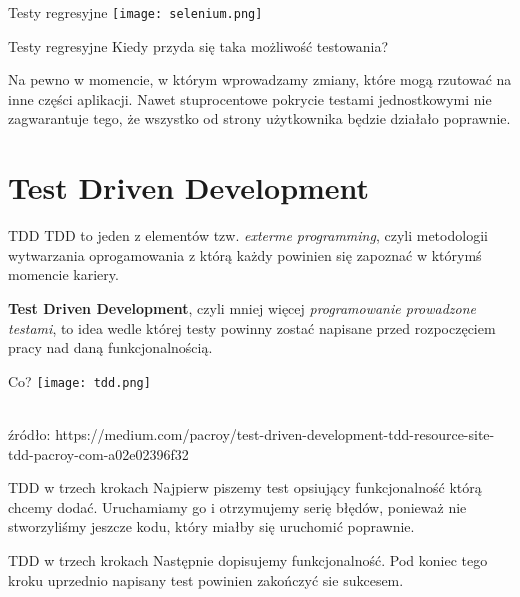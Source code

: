 \begin{frame}{Testy regresyjne}
	\centering
	\texttt{[image: selenium.png]}
\end{frame}

\begin{frame}{Testy regresyjne}
	Kiedy przyda się taka możliwość testowania?
	
	Na pewno w momencie, w którym wprowadzamy zmiany, które mogą rzutować na inne części aplikacji. Nawet stuprocentowe pokrycie testami jednostkowymi nie zagwarantuje tego, że wszystko od strony użytkownika będzie działało poprawnie.
\end{frame}

\section{Test Driven Development}

\begin{frame}[fragile]{TDD}
	TDD to jeden z elementów tzw. \emph{exterme programming}, czyli metodologii wytwarzania oprogamowania z którą każdy powinien się zapoznać w którymś momencie kariery.
	
	\textbf{Test Driven Development}, czyli mniej więcej \emph{programowanie prowadzone testami}, to idea wedle której testy powinny zostać napisane przed rozpoczęciem pracy nad daną funkcjonalnością.
\end{frame}

\begin{frame}{Co?}
	\centering
	\texttt{[image: tdd.png]}
	
	\ \\
	
	źródło: https://medium.com/pacroy/test-driven-development-tdd-resource-site-tdd-pacroy-com-a02e02396f32
\end{frame}

\begin{frame}{TDD w trzech krokach}
	Najpierw piszemy test opsiujący funkcjonalność którą chcemy dodać. Uruchamiamy go i otrzymujemy serię błędów, ponieważ nie stworzyliśmy jeszcze kodu, który miałby się uruchomić poprawnie.
\end{frame}

\begin{frame}{TDD w trzech krokach}	
	Następnie dopisujemy funkcjonalność. Pod koniec tego kroku uprzednio napisany test powinien zakończyć sie sukcesem.
\end{frame}

